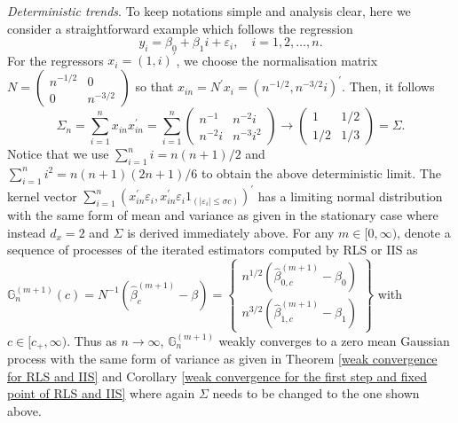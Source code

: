 \documentclass[11pt, letterpaper]{article}
\numberwithin{algorithm}{section}
\numberwithin{assumption}{section}
\numberwithin{lemma}{section}
\numberwithin{theorem}{section}
\numberwithin{corollary}{section}
\numberwithin{remark}{section}
\numberwithin{equation}{section}
\numberwithin{figure}{section}
\numberwithin{table}{section}
\begin{document}
\emph{Deterministic trends}. To keep notations simple and analysis clear, here we consider a straightforward example which follows the regression
\begin{equation*}
y_{i} = \beta_{0} + \beta_{1} i + \varepsilon_{i}, \quad i = 1, 2, \ldots, n.
\end{equation*}
For the regressors $x_{i} = (1, i)^{\prime}$, we choose the normalisation matrix
$
N =
\begin{pmatrix}
n^{-1/2} & 0 \\
0 & n^{-3/2}
\end{pmatrix}
$ so that $x_{in} = N^{\prime} x_{i} = (n^{-1/2}, n^{-3/2} i)^{\prime}$. Then, it follows
\begin{equation*}
\Sigma_{n} = \sum_{i = 1}^{n} x_{in} x_{in}^{\prime} =
\sum_{i = 1}^{n}
\begin{pmatrix}
n^{-1} & n^{-2} i \\
n^{-2} i & n^{-3} i^{2}
\end{pmatrix}
\to
\begin{pmatrix}
1 & 1/2 \\
1/2 & 1/3
\end{pmatrix}
= \Sigma.
\end{equation*}
Notice that we use $\sum_{i = 1}^{n} i = n (n + 1) / 2$ and $\sum_{i = 1}^{n} i^{2} = n (n + 1) (2n + 1) / 6$ to obtain the above deterministic limit. The kernel vector $\sum_{i = 1}^{n} (x_{in}^{\prime} \varepsilon_{i}, x_{in}^{\prime} \varepsilon_{i} 1_{(|\varepsilon_{i}| \le \sigma c)})^{\prime}$ has a limiting normal distribution with the same form of mean and variance as given in the stationary case where instead $d_{x} = 2$ and $\Sigma$ is derived immediately above. For any $m \in [0, \infty)$, denote a sequence of processes of the iterated estimators computed by RLS or IIS as
$
\mathbb{G}_{n}^{(m + 1)}(c) = N^{-1} (\widehat{\beta}_{c}^{(m + 1)} - \beta) =
\begin{Bmatrix}
n^{1/2} (\widehat{\beta}_{0, c}^{(m + 1)} - \beta_{0}) \\
n^{3/2} (\widehat{\beta}_{1, c}^{(m + 1)} - \beta_{1})
\end{Bmatrix}
$
with $c \in [c_{+}, \infty)$. Thus as $n \to \infty$, $\mathbb{G}_{n}^{(m + 1)}$ weakly converges to a zero mean Gaussian process with the same form of variance as given in Theorem \ref{weak convergence for RLS and IIS} and Corollary \ref{weak convergence for the first step and fixed point of RLS and IIS} where again $\Sigma$ needs to be changed to the one shown above.
\end{document}
